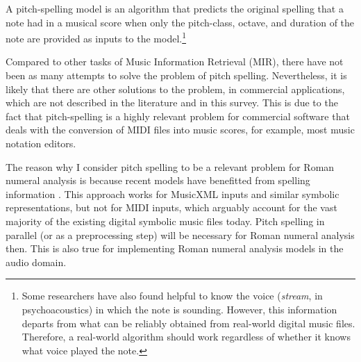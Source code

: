 

A pitch-spelling model is an algorithm that predicts the
original spelling that a note had in a musical score when
only the pitch-class, octave, and duration of the note are
provided as inputs to the model.\footnote{Some researchers
have also found helpful to know the voice (\emph{stream}, in
psychoacoustics) in which the note is sounding. However,
this information departs from what can be reliably obtained
from real-world digital music files. Therefore, a real-world
algorithm should work regardless of whether it knows what
voice played the note.}


Compared to other tasks of Music Information Retrieval
(MIR), there have not been as many attempts to solve the
problem of pitch spelling. Nevertheless, it is likely that
there are other solutions to the problem, in commercial
applications, which are not described in the literature and
in this survey. This is due to the fact that pitch-spelling
is a highly relevant problem for commercial software that
deals with the conversion of MIDI files into music scores,
for example, most music notation editors.

The reason why I consider pitch spelling to be a relevant problem for Roman numeral analysis is because recent models have benefitted from spelling information \parencite{micchi2020not}. This approach works for MusicXML inputs and similar symbolic representations, but not for MIDI inputs, which arguably account for the vast majority of the existing digital symbolic music files today. Pitch spelling in parallel (or as a preprocessing step) will be necessary for Roman numeral analysis then. This is also true for implementing Roman numeral analysis models in the audio domain.
